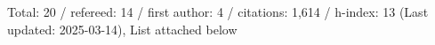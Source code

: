 Total: 20 / refereed: 14 / first author: 4 / citations: 1,614 / h-index: 13 (Last updated: 2025-03-14), List attached below